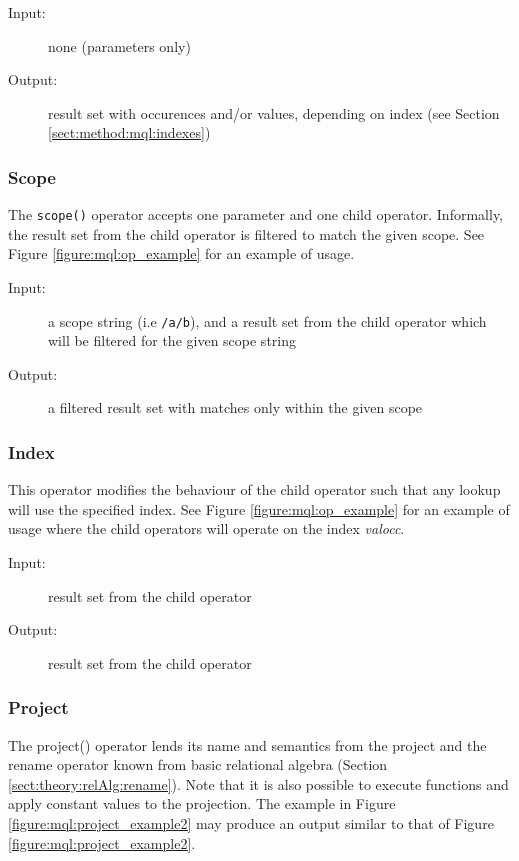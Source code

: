\begin{description}
  \item[Input:] none (parameters only)
  \item[Output:] result set with occurences and/or values, depending on index
(see Section \ref{sect:method:mql:indexes})
\end{description}

\subsubsection{Scope}
\label{sect:method:marsOperators:scope}
The \texttt{scope()} operator accepts one parameter and one child operator. Informally, the
result set from the child operator is filtered to match the given scope. See
Figure \ref{figure:mql:op_example} for an example of usage.

\begin{description}
  \item[Input:] a scope string (i.e \texttt{/a/b}), and a result set from the
child operator which will be filtered for the given scope string
  \item[Output:] a filtered result set with matches only within the given scope
\end{description}

\subsubsection{Index}
\label{sect:method:marsOperators:index}
This operator modifies the behaviour of the child operator such that any lookup
will use the specified index. See Figure \ref{figure:mql:op_example} for an
example of usage where the child operators will operate on the index
\textit{valocc}.

\begin{description}
  \item[Input:] result set from the child operator
  \item[Output:] result set from the child operator
\end{description}

\subsubsection{Project}
\label{sect:method:marsOperators:project}
The \textsf{project()} operator lends its name and semantics from the project and the rename operator known from
basic relational algebra (Section \ref{sect:theory:relAlg:rename}). Note that it is also possible to execute
functions and apply constant values to the projection. The example in Figure \ref{figure:mql:project_example2} may
produce an output similar to that of Figure \ref{figure:mql:project_example2}.

